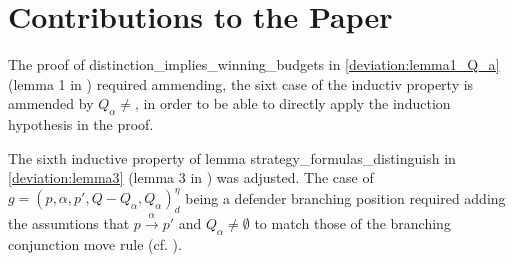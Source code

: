 \section{Contributions to the Paper}
The proof of distinction\_implies\_winning\_budgets in \ref{deviation:lemma1_Q_a} (lemma 1 in \cite{bisping2023lineartimebranchingtime}) required ammending, the sixt case of the inductiv property is ammended by $Q_\alpha \neq {}$, in order to be able to directly apply the induction hypothesis in the proof.

The sixth inductive property of lemma strategy\_formulas\_distinguish in \ref{deviation:lemma3} (lemma 3 in \cite{bisping2023lineartimebranchingtime}) was adjusted. The case of $g=(p,\alpha ,p', Q- Q_\alpha, Q_\alpha)_d^\eta$ being a defender branching position required adding the assumtions that $p \overset{\alpha}{\longrightarrow} p'$ and $Q_\alpha \neq \emptyset$ to match those of the branching conjunction move rule (cf. \cite[p. 13]{bisping2023lineartimebranchingtime}).